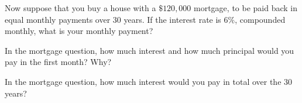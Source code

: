 \documentclass{ximera}
\begin{document}
\begin{question}
Now suppose that you buy a house with a $\$120,000$ mortgage, to be
paid back in equal monthly payments over $30$ years.  If the interest
rate is $6\%$, compounded monthly, what is your monthly payment?
\begin{freeResponse}
\end{freeResponse}
\end{question}

\begin{question}
In the mortgage question, how much interest and how much principal
would you pay in the first month? Why?
\begin{freeResponse}
\end{freeResponse}
\end{question}

\begin{question}
In the mortgage question, how much interest would you pay in total
over the $30$ years?
\begin{freeResponse}
\end{freeResponse}
\end{question}
\end{document}
